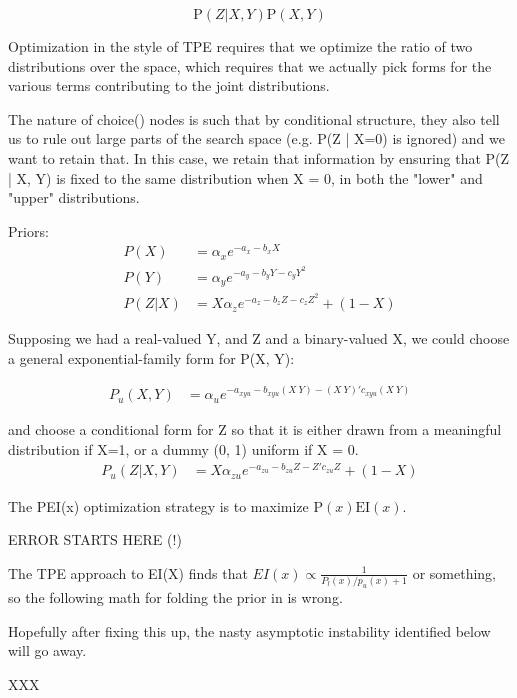 \documentclass{article}
\begin{document}
\begin{equation}
    \mathrm{P}(Z | X, Y) \mathrm{P}(X, Y)
\end{equation}


Optimization in the style of TPE requires that we optimize the ratio of two
distributions over the space, which requires that we actually pick forms for
the various terms contributing to the joint distributions.

The nature of choice() nodes is such that by conditional structure, they also
tell us to rule out large parts of the search space (e.g. P(Z | X=0) is
ignored) and we want to retain that.  In this case, we retain that information
by ensuring that P(Z | X, Y) is fixed to the same distribution when X = 0, in
both the "lower" and "upper" distributions.

Priors:
\begin{align}
    P(X) &= \alpha_{x} e^{-a_{x} - b_{x}X} \\
    P(Y) &= \alpha_{y} e^{-a_{y} - b_{y}Y - c_{y}Y^2} \\
    P(Z|X) &= X \alpha_{z} e^{-a_{z} - b_{z}Z - c_{z}Z^2} + (1 - X)
\end{align}


Supposing we had a real-valued Y, and Z and a binary-valued X, we could choose a general exponential-family form for P(X, Y):

\begin{align}
    P_u(X, Y)
    &= \alpha_u e^{ -a_{xyu} -b_{xyu} (X~Y) -(X~Y)'c_{xyu}(X~Y)}
\end{align}

and choose a conditional form for Z so that it is either drawn from a meaningful distribution if X=1,
or a dummy (0, 1) uniform if X = 0.
\begin{align}
    P_u(Z | X, Y)
    &= X \alpha_{zu} e^{-a_{zu} - b_{zu}Z - Z'c_{zu}Z} + (1 - X)
\end{align}


The PEI(x) optimization strategy is to maximize $\mathrm{P}(x) \mathrm{EI}(x)$.

ERROR STARTS HERE (!)

The TPE approach to EI(X) finds that $EI(x) \propto \frac{1}{P_l(x)/p_u(x) + 1}$ or something,
so the following math for folding the prior in is wrong.

Hopefully after fixing this up, the nasty asymptotic instability identified below will go away.

XXX
\end{document}

